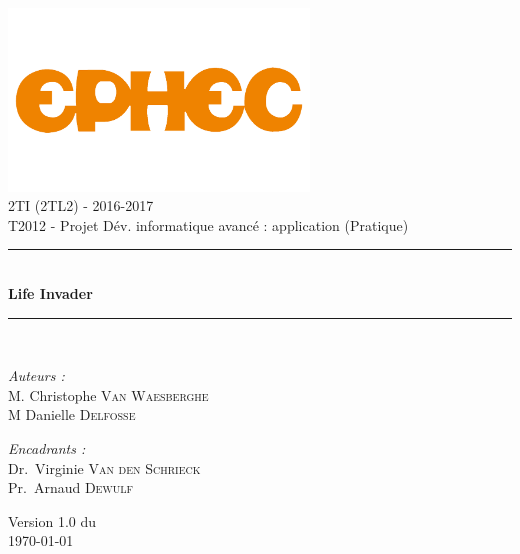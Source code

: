 \documentclass[a4paper,12pt, oneside]{book}
\theoremstyle{break}
\begin{document}

\begin{titlepage}
\begin{center}

\includegraphics[width=0.6\textwidth]{logo-ephec}\\[1cm]

{\large 2TI (2TL2) - 2016-2017}\\[0.5cm]

{\large T2012 - Projet Dév. informatique avancé : application (Pratique)}\\[0.5cm]

\rule{\linewidth}{0.5mm} \\[0.4cm]
{ \huge \bfseries Life Invader\\[0.4cm] }
\rule{\linewidth}{0.5mm} \\[1.5cm]

\noindent
\begin{minipage}{0.5\textwidth}
  \begin{flushleft} \large
    \emph{Auteurs :}\\
    M. Christophe \textsc{Van Waesberghe}\\
    M Danielle \textsc{Delfosse}\\
  \end{flushleft}
\end{minipage}%
\begin{minipage}{0.5\textwidth}
  \begin{flushright} \large
    \emph{Encadrants :} \\
    Dr.~Virginie \textsc{Van den Schrieck}\\
    Pr.~Arnaud \textsc{Dewulf}
  \end{flushright}
\end{minipage}

\vfill

{\large Version 1.0 du\\ \today}

\end{center}
\end{titlepage}
\end{document}
